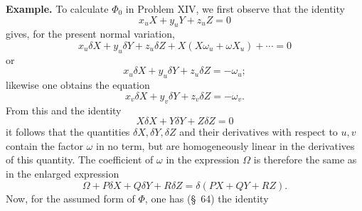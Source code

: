 \documentclass[11pt,a4paper,leqno]{article}
\begin{document}
\textbf{Example.} To calculate $\Phi_0$ in Problem XIV, we first observe
that the identity
\[
x_uX+y_uY+z_uZ=0
\]
gives, for the present normal variation,
\[
x_u\delta X+y_u\delta Y+z_u\delta Z
+X(X\omega_u+\omega X_u)+\cdots=0
\]
or
\[
x_u\delta X+y_u\delta Y+z_u\delta Z=-\omega_u;
\]
likewise one obtains the equation
\[
x_v\delta X+y_v\delta Y+z_v\delta Z=-\omega_v.
\]
From this and the identity
\[
X\delta X+Y\delta Y+Z\delta Z=0
\]
it follows that the quantities $\delta X,\delta Y,\delta Z$ and their
derivatives with respect to $u,v$ contain the factor $\omega$ in no term,
but are homogeneously linear in the derivatives of this quantity. The
coefficient of $\omega$ in the expression $\Omega$ is therefore the same
as in the enlarged expression
\begin{equation}\tag{30}
\Omega+P\delta X+Q\delta Y+R\delta Z=\delta(PX+QY+RZ).
\end{equation}
Now, for the assumed form of $\Phi$, one has (\S~64) the identity
\end{document}
